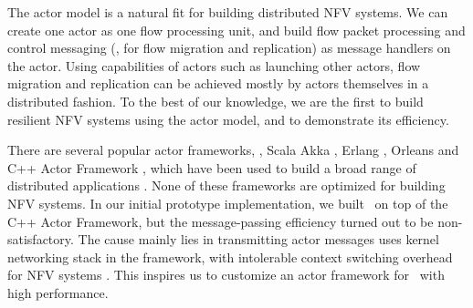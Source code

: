 The actor model is a natural fit for building distributed NFV systems. We can create one actor as one flow processing unit, %
 and build flow packet processing and control messaging (\eg, for flow migration and replication) as message handlers on the actor. Using capabilities of actors such as launching other actors, flow migration and replication can be achieved mostly by actors themselves in a distributed fashion. %
 To the best of our knowledge, we are the first to build resilient NFV systems using the actor model, and to demonstrate its efficiency.



There are several popular actor frameworks, \eg, Scala Akka \cite{akka}, Erlang \cite{erlang}, Orleans \cite{Orleans} and C++ Actor Framework \cite{caf}, which have been used to build a broad range of distributed applications \cite{akka}. %
 None of these frameworks are optimized for building NFV systems. In our initial prototype implementation, we built \nfactor~on top of the C++ Actor Framework, but the message-passing efficiency turned out to be non-satisfactory. The cause mainly lies in transmitting actor messages uses kernel networking stack in the framework, with intolerable context switching overhead for NFV systems \cite{martins2014clickos}. This inspires us to customize an actor framework for \nfactor~with high performance.

